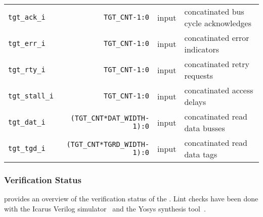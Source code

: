\begin{center}
\begin{longtable}{|l|r|l|l|}
    \texttt{tgt\_ack\_i}         & \texttt{TGT\_CNT-1:0}               & input  & concatinated bus cycle acknowledges \\*
    \texttt{tgt\_err\_i}         & \texttt{TGT\_CNT-1:0}               & input  & concatinated error indicators	      \\*
    \texttt{tgt\_rty\_i}         & \texttt{TGT\_CNT-1:0}               & input  & concatinated retry requests	      \\*
    \texttt{tgt\_stall\_i}       & \texttt{TGT\_CNT-1:0}               & input  & concatinated access delays	      \\*
    \texttt{tgt\_dat\_i}         & \texttt{(TGT\_CNT*DAT\_WIDTH-1):0}  & input  & concatinated read data busses	      \\*
    \texttt{tgt\_tgd\_i}         & \texttt{(TGT\_CNT*TGRD\_WIDTH-1):0} & input  & concatinated read data tags         \\   
  \end{longtable}
\end{center}  
\endgroup

\subsubsection{Verification Status}
\label{xbar:verif}

 provides an overview of the verification status of the .
Lint checks have been done with the Icarus Verilog simulator~\cite{iverilog} and the Yosys synthesis tool~\cite{yosys}.

